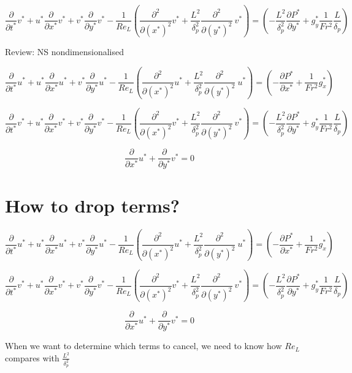 \documentclass[11pt]{article}
\begin{document}
$$  \frac{\partial }{\partial t^*} v^* + u^*  \frac{\partial}{\partial x^*} v^* + v^* \frac{\partial}{\partial y^*} v^* -  \frac{1}{Re_L } ( \frac{\partial^2}{\partial (x^*)^2} v^* + \frac{L^2}{\delta_p^2} \frac{\partial^2}{\partial (y^*)^2} \ v^* ) =  (- \frac{L^2 }{\delta_p^2} \frac{\partial P^*}{\partial y^*} +g_y^*\frac{1}{Fr^2}\frac{L }{ \delta_p})$$


Review: NS nondimensionalised

$$\frac{\partial }{\partial t^*} u^* + u^*  \frac{\partial}{\partial x^* } u^* + v^*  \frac{\partial}{\partial y^*} u^* - \frac{1}{Re_L}  ( \frac{\partial^2}{\partial (x^*)^2} u^* + \frac{L^2}{\delta_p^2} \frac{\partial^2}{\partial (y^*)^2} \ u^* ) =  ( -  \frac{\partial P^*}{\partial x^*} + \frac{1}{Fr^2}g_x^* )$$


$$  \frac{\partial }{\partial t^*} v^* + u^*  \frac{\partial}{\partial x^*} v^* + v^* \frac{\partial}{\partial y^*} v^* -  \frac{1}{Re_L } ( \frac{\partial^2}{\partial (x^*)^2} v^* + \frac{L^2}{\delta_p^2} \frac{\partial^2}{\partial (y^*)^2} \ v^* ) =  (- \frac{L^2 }{\delta_p^2} \frac{\partial P^*}{\partial y^*} +g_y^*\frac{1}{Fr^2}\frac{L }{ \delta_p})$$

$$\frac{\partial }{\partial x^* } u^* + \frac{\partial}{\partial y^*} v^* =0 $$

\section{How to drop terms?}

$$\frac{\partial }{\partial t^*} u^* + u^*  \frac{\partial}{\partial x^* } u^* + v^*  \frac{\partial}{\partial y^*} u^* - \frac{1}{Re_L}  ( \frac{\partial^2}{\partial (x^*)^2} u^* + \frac{L^2}{\delta_p^2} \frac{\partial^2}{\partial (y^*)^2} \ u^* ) =  ( -  \frac{\partial P^*}{\partial x^*} + \frac{1}{Fr^2}g_x^* )$$


$$  \frac{\partial }{\partial t^*} v^* + u^*  \frac{\partial}{\partial x^*} v^* + v^* \frac{\partial}{\partial y^*} v^* -  \frac{1}{Re_L } ( \frac{\partial^2}{\partial (x^*)^2} v^* + \frac{L^2}{\delta_p^2} \frac{\partial^2}{\partial (y^*)^2} \ v^* ) =  (- \frac{L^2 }{\delta_p^2} \frac{\partial P^*}{\partial y^*} +g_y^*\frac{1}{Fr^2}\frac{L }{ \delta_p})$$

$$\frac{\partial }{\partial x^* } u^* + \frac{\partial}{\partial y^*} v^* =0 $$

When we want to determine which terms to cancel, we need to know how $Re_L$ compares with $\frac{L^2}{\delta_p^2}$
\end{document}
